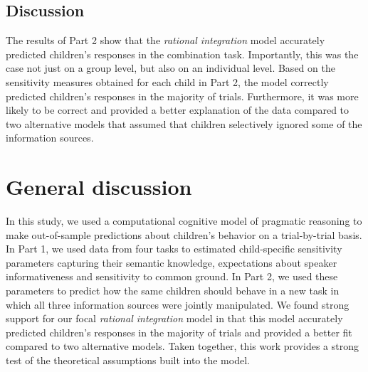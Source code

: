 \documentclass[
  man,floatsintext]{apa6}
\begin{document}
\hypertarget{discussion-1}{%
\subsection{Discussion}\label{discussion-1}}

The results of Part 2 show that the \emph{rational integration} model accurately predicted children's responses in the combination task. Importantly, this was the case not just on a group level, but also on an individual level. Based on the sensitivity measures obtained for each child in Part 2, the model correctly predicted children's responses in the majority of trials. Furthermore, it was more likely to be correct and provided a better explanation of the data compared to two alternative models that assumed that children selectively ignored some of the information sources.

\hypertarget{general-discussion}{%
\section{General discussion}\label{general-discussion}}

In this study, we used a computational cognitive model of pragmatic reasoning to make out-of-sample predictions about children's behavior on a trial-by-trial basis. In Part 1, we used data from four tasks to estimated child-specific sensitivity parameters capturing their semantic knowledge, expectations about speaker informativeness and sensitivity to common ground. In Part 2, we used these parameters to predict how the same children should behave in a new task in which all three information sources were jointly manipulated. We found strong support for our focal \emph{rational integration} model in that this model accurately predicted children's responses in the majority of trials and provided a better fit compared to two alternative models. Taken together, this work provides a strong test of the theoretical assumptions built into the model.
\end{document}
